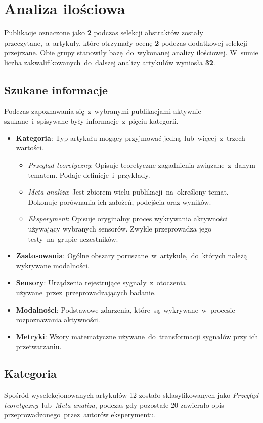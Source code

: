 \section{Analiza ilościowa}
Publikacje oznaczone jako {\bf 2} podczas selekcji abstraktów zostały przeczytane,~a~artykuły, które otrzymały ocenę {\bf 2} podczas dodatkowej selekcji --- przejrzane. Obie grupy stanowiły bazę~do~wykonanej analizy ilościowej. W~sumie liczba zakwalifikowanych~do~dalszej analizy artykułów wyniosła {\bf 32}.

\subsection{Szukane informacje}
Podczas zapoznawania się~z~wybranymi publikacjami aktywnie szukane~i~spisywane były informacje~z~pięciu kategorii.
\begin{itemize}
    \item {\bf Kategoria}: Typ artykułu mogący przyjmować jedną~lub~więcej~z~trzech wartości.
    \begin{itemize}
		\item {\it Przegląd teoretyczny}: Opisuje teoretyczne zagadnienia związane~z~danym tematem. Podaje definicje~i~przykłady.
		\item {\it Meta-analiza}: Jest zbiorem wielu publikacji~na~określony temat. Dokonuje porównania ich założeń, podejścia oraz wyników.
		\item {\it Eksperyment}: Opisuje oryginalny proces wykrywania aktywności używający wybranych sensorów. Zwykle przeprowadza jego testy~na~grupie uczestników.
	\end{itemize}
    \item {\bf Zastosowania}: Ogólne obszary poruszane~w~artykule,~do~których należą wykrywane modalności.
    \item {\bf Sensory}: Urządzenia rejestrujące sygnały~z~otoczenia używane~przez~przeprowadzających badanie.
    \item {\bf Modalności}: Podstawowe zdarzenia, które~są~wykrywane~w~procesie rozpoznawania aktywności.
    \item {\bf Metryki}: Wzory matematyczne używane~do~transformacji sygnałów przy ich przetwarzaniu.
\end{itemize}

\subsection{Kategoria}
Spośród wyselekcjonowanych artykułów 12 zostało sklasyfikowanych jako \textit{Przegląd teoretyczny}~lub~\textit{Meta-analiza}, podczas gdy pozostałe 20 zawierało opis przeprowadzonego~przez~autorów eksperymentu. 

